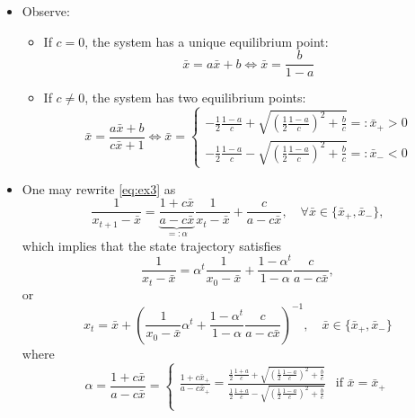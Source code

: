 \documentclass[12pt,a4paper]{article}
\begin{document}
\begin{itemize}
\begin{itemize}
  \item Observe:
    \begin{itemize}
    \item If $c = 0$, the system has a unique equilibrium point:
      \begin{equation}\nonumber%
        \bar{x} = a\bar{x} + b
        \iff
        \bar{x} = \frac{b}{1-a}
      \end{equation}
    \item If $c \neq 0$, the system has two equilibrium points:
      \begin{equation}\nonumber%
        \bar{x} = \frac{a\bar{x}+b}{c\bar{x}+1}
        \iff
        \bar{x} =
        \begin{cases}
          - \frac{1}{2}\frac{1-a}{c} + \sqrt{\left(\frac{1}{2}\frac{1-a}{c}\right)^{2} + \frac{b}{c}} =:\bar{x}_{+} > 0  \\
          - \frac{1}{2}\frac{1-a}{c} - \sqrt{\left(\frac{1}{2}\frac{1-a}{c}\right)^{2} + \frac{b}{c}} =:\bar{x}_{-} < 0
        \end{cases}
      \end{equation}
    \end{itemize}
  \item One may rewrite \eqref{eq:ex3} as
    \begin{equation}\nonumber%
      \frac{1}{x_{t+1}-\bar{x}} = \underbrace{\frac{1+c\bar{x}}{a-c\bar{x}}}_{=:\alpha}\frac{1}{x_{t}-\bar{x}} + \frac{c}{a-c\bar{x}},
      \quad \forall \bar{x} \in \{\bar{x}_{+}, \bar{x}_{-}\},
    \end{equation}
    which implies that the state trajectory satisfies
    \begin{equation}\nonumber%
      \frac{1}{x_{t}-\bar{x}} = \alpha^{t}\frac{1}{x_{0}-\bar{x}} + \frac{1-\alpha^{t}}{1-\alpha}\frac{c}{a-c\bar{x}},
    \end{equation}
    or
    \begin{equation}\label{eq:xt1}%
      x_{t} = \bar{x} + \left(\frac{1}{x_{0}-\bar{x}}\alpha^{t} + \frac{1-\alpha^{t}}{1-\alpha} \frac{c}{a-c\bar{x}} \right)^{-1},
      \quad \bar{x} \in \{\bar{x}_{+}, \bar{x}_{-}\}
    \end{equation}
    where
    \begin{equation}\nonumber%
      \alpha
      = \frac{1+c\bar{x}}{a-c\bar{x}}
      =
      \begin{cases}
        \frac{1+c\bar{x}_{+}}{a-c\bar{x}_{+}}
        =
        \frac{\frac{1}{2}\frac{1+a}{c} + \sqrt{\left(\frac{1}{2}\frac{1-a}{c}\right)^{2} + \frac{b}{c}}}{\frac{1}{2}\frac{1+a}{c} - \sqrt{\left(\frac{1}{2}\frac{1-a}{c}\right)^{2} + \frac{b}{c}}} & \text{if $\bar{x}=\bar{x}_{+}$}\\

\end{cases}
\end{equation}
\end{itemize}
\end{itemize}
\end{document}
